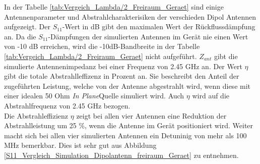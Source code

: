 In der Tabelle \ref{tab:Vergeich_Lambda/2_Freiraum_Geraet} sind einige Antennenparameter und Abstrahlcharakterisiken der verschieden Dipol Antennen aufgezeigt. Der $S_{11}$-Wert in dB gibt den maximalen Wert der Rückflussdämpfung an. Da die $S_{11}$-Dämpfungen der simulierten Antennen im Gerät  nie einen Wert von -10 dB erreichen, wird die -10dB-Bandbreite in der Tabelle \ref{tab:Vergeich_Lambda/2_Freiraum_Geraet} nicht aufgeführt.
$Z_{ant}$ gibt die simulierte Antennenimpedanz bei einer Frequenz von 2.45 GHz an.
Der Wert $\eta$ gibt die totale Abstrahlleffizenz in Prozent an. 
Sie beschreibt den Anteil der zugeführten Leistung, welche von der Antenne abgestrahlt wird, wenn diese mit einer idealen 50 Ohm \textit{In Plane}Quelle simuliert wird. 
%
Auch $\eta$ wird auf die Abstrahlfrequenz von 2.45 GHz bezogen.\\
Die Abstrahleffizienz $\eta$ zeigt bei allen vier Antennen eine Reduktion der Abstrahlleistung um 25 $\%$, wenn die Antenne im Gerät positioniert wird. Weiter macht sich bei allen vier simulierten Antennen ein Detuninig von mehr als 100 MHz bemerkbar. Dies ist sehr gut aus Abbildung \ref{S11_Vergleich_Simulation_Dipolantenn_freiraum_Geraet} zu entnehmen. 



